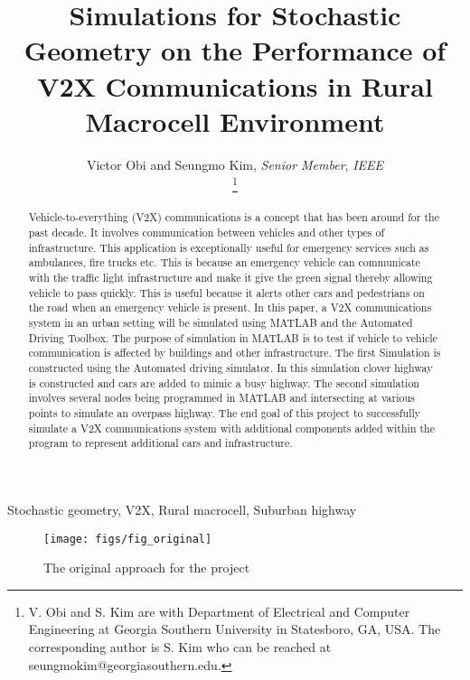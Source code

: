 \documentclass[journal]{IEEEtran}
\begin{document}
\title{\fontsize{20}{24}\selectfont Simulations for Stochastic Geometry on the Performance of V2X Communications in Rural Macrocell Environment}


\author
{
Victor Obi and Seungmo Kim, \textit{Senior Member}, \textit{IEEE}

\thanks{V. Obi and S. Kim are with Department of Electrical and Computer Engineering at Georgia Southern University in Statesboro, GA, USA. The corresponding author is S. Kim who can be reached at seungmokim@georgiasouthern.edu.}
}


\maketitle

\begin{abstract}
Vehicle-to-everything (V2X) communications is a concept that has been around for the past decade. It involves communication between vehicles and other types of infrastructure. This application is exceptionally useful for emergency services such as ambulances, fire trucks etc. This is because an emergency vehicle can communicate with the traffic light infrastructure and make it give the green signal thereby allowing vehicle to pass quickly. This is useful because it alerts other cars and pedestrians on the road when an emergency vehicle is present.  In this paper, a V2X communications system in an urban setting will be simulated using MATLAB and the Automated Driving Toolbox. The purpose of simulation in MATLAB is to test if vehicle to vehicle communication is affected by buildings and other infrastructure. The first Simulation is constructed using the Automated driving simulator. In this simulation clover highway is constructed and cars are added to mimic a busy highway. The second simulation involves several nodes being programmed in MATLAB and intersecting at various points to simulate an overpass highway. The end goal of this project to successfully simulate a V2X communications system with additional components added within the program to represent additional cars and infrastructure.
\end{abstract}

\begin{IEEEkeywords}
Stochastic geometry, V2X, Rural macrocell, Suburban highway
\end{IEEEkeywords}


\begin{figure*}
\centering
\texttt{[image: figs/fig\_original]}
\caption{The original approach for the project}
\label{fig_original}
\end{figure*}
\end{document}
